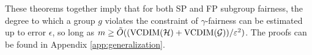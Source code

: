 These theorems together imply that for both SP and FP subgroup
fairness, the degree to which a group $g$ violates the constraint of
$\gamma$-fairness can be estimated up to error $\epsilon$, so long as
$m \geq \tilde O((\mathrm{VCDIM}(\mathcal{H}) +
\mathrm{VCDIM}(\mathcal{G}))/\varepsilon^2)$. The proofs can be found in Appendix
\ref{app:generalization}.





